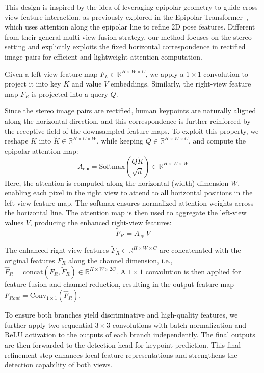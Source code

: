 \documentclass[journal]{IEEEtran}
\begin{document}
This design is inspired by the idea of leveraging epipolar geometry to guide cross-view feature interaction, as previously explored in the Epipolar Transformer~, which uses attention along the epipolar line to refine 2D pose features. Different from their general multi-view fusion strategy, our method focuses on the stereo setting and explicitly exploits the fixed horizontal correspondence in rectified image pairs for efficient and lightweight attention computation.

Given a left-view feature map \( F_L \in \mathbb{R}^{H \times W \times C} \), we apply a \(1 \times 1\) convolution to project it into key \(K\) and value \(V\) embeddings. Similarly, the right-view feature map \( F_R \) is projected into a query \(Q\).

Since the stereo image pairs are rectified, human keypoints are naturally aligned along the horizontal direction, and this correspondence is further reinforced by the receptive field of the downsampled feature maps. To exploit this property, we reshape \( K \) into \( \tilde{K} \in \mathbb{R}^{H \times C \times W} \), while keeping \( Q \in \mathbb{R}^{H \times W \times C} \), and compute the epipolar attention map:
\begin{equation}
A_{\text{epi}} = \text{Softmax} \left( \frac{Q \tilde{K}}{\sqrt{d}} \right ) \in \mathbb{R}^{H \times W \times W}
\end{equation}
Here, the attention is computed along the horizontal (width) dimension \( W \), enabling each pixel in the right view to attend to all horizontal positions in the left-view feature map. The softmax ensures normalized attention weights across the horizontal line. The attention map is then used to aggregate the left-view values \( V \), producing the enhanced right-view features:
\begin{equation}
\tilde{F}_R = A_{\text{epi}} V
\end{equation}

The enhanced right-view features \( \tilde{F}_R \in \mathbb{R}^{H \times W \times C} \) are concatenated with the original features \( F_R \) along the channel dimension, i.e., \( \hat{F}_R = \text{concat}(F_R, \tilde{F}_R) \in \mathbb{R}^{H \times W \times 2C} \). A \(1 \times 1\) convolution is then applied for feature fusion and channel reduction, resulting in the output feature map \( F_{Rout} = \text{Conv}_{1 \times 1}(\hat{F}_R) \).

To ensure both branches yield discriminative and high-quality features, we further apply two sequential \(3 \times 3\) convolutions with batch normalization and ReLU activation to the outputs of each branch independently. The final outputs are then forwarded to the detection head for keypoint prediction. This final refinement step enhances local feature representations and strengthens the detection capability of both views.
\end{document}
